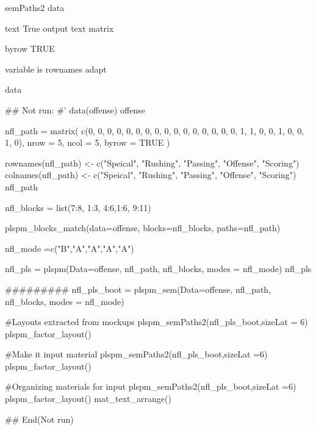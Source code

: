 \documentclass[a4paper]{book}
\begin{document}
%
\begin{Arguments}
\begin{ldescription}
\item[\code{semplot}] semPaths2 data

\item[\code{text}] text True output text matrix

\item[\code{byrow}] byrow TRUE

\item[\code{variable}] variable is rownames adapt
\end{ldescription}
\end{Arguments}
%
\begin{Value}
data
\end{Value}
%
\begin{Examples}
\begin{ExampleCode}


## Not run: 
#'
data(offense)
offense %

nfl_path = matrix(
  c(0, 0, 0, 0, 0,
    0, 0, 0, 0, 0,
    0, 0, 0, 0, 0,
    0, 1, 1, 0, 0,
    1, 0, 0, 1, 0),
  nrow = 5, ncol = 5, byrow = TRUE )

rownames(nfl_path) <- c("Speical", "Rushing", "Passing", "Offense", "Scoring")
colnames(nfl_path) <- c("Speical", "Rushing", "Passing", "Offense", "Scoring")
nfl_path

nfl_blocks = list(7:8, 1:3, 4:6,1:6, 9:11)

plspm_blocks_match(data=offense, blocks=nfl_blocks,
                   paths=nfl_path)

nfl_mode =c("B","A","A","A","A")

nfl_pls = plspm(Data=offense, nfl_path, nfl_blocks, modes = nfl_mode)
nfl_pls%

#########
nfl_pls_boot = plspm_sem(Data=offense, nfl_path, nfl_blocks, modes = nfl_mode)

#Layouts extracted from mockups
plspm_semPaths2(nfl_pls_boot,sizeLat = 6)%
  plspm_factor_layout()

#Make it input material
plspm_semPaths2(nfl_pls_boot,sizeLat =6)%
  plspm_factor_layout() %

#Organizing materials for input
plspm_semPaths2(nfl_pls_boot,sizeLat =6)%
  plspm_factor_layout() %
  mat_text_arrange()

## End(Not run)

\end{ExampleCode}
\end{Examples}
\end{document}
